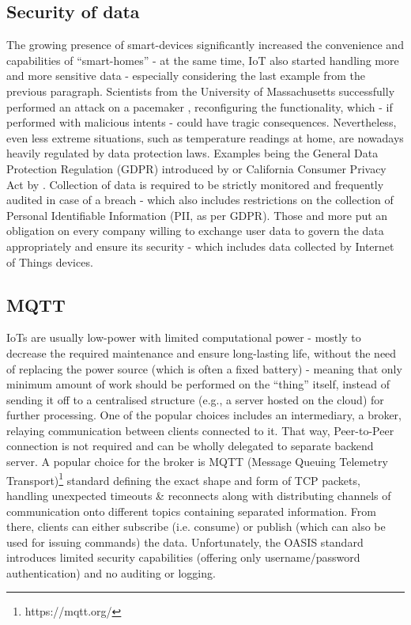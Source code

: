 \subsection{Security of data}
The growing presence of smart-devices significantly increased the convenience and capabilities of ``smart-homes'' - at the same time, IoT also started handling more and more sensitive data - especially considering the last example from the previous paragraph. Scientists from the University of Massachusetts successfully performed an attack on a pacemaker \cite{4531149}, reconfiguring the functionality, which - if performed with malicious intents - could have tragic consequences. Nevertheless, even less extreme situations, such as temperature readings at home, are nowadays heavily regulated by data protection laws. Examples being the General Data Protection Regulation (GDPR) introduced by \citet{EUdataregulations2018} or California Consumer Privacy Act by \citet{CCPA}. Collection of data is required to be strictly monitored and frequently audited in case of a breach - which also includes restrictions on the collection of Personal Identifiable Information (PII, as per GDPR). Those and more put an obligation on every company willing to exchange user data to govern the data appropriately and ensure its security - which includes data collected by Internet of Things devices.

\subsection{MQTT}
IoTs are usually low-power with limited computational power - mostly to decrease the required maintenance and ensure long-lasting life, without the need of replacing the power source (which is often a fixed battery) - meaning that only minimum amount of work should be performed on the ``thing'' itself, instead of sending it off to a centralised structure (e.g., a server hosted on the cloud) for further processing. One of the popular choices includes an intermediary, a broker, relaying communication between clients connected to it. That way, Peer-to-Peer connection is not required and can be wholly delegated to separate backend server. A popular choice for the broker is MQTT (Message Queuing Telemetry Transport)\footnote{https://mqtt.org/} standard defining the exact shape and form of TCP packets, handling unexpected timeouts \& reconnects along with distributing channels of communication onto different topics containing separated information. From there, clients can either subscribe (i.e. consume) or publish (which can also be used for issuing commands) the data. Unfortunately, the OASIS standard introduces limited security capabilities (offering only username/password authentication) and no auditing or logging.

